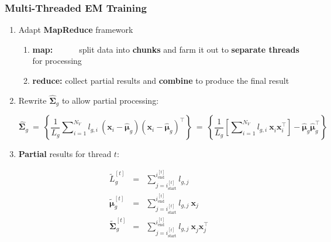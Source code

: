 \documentclass[usenames,dvipsnames]{beamer}
\def\Vec#1{{\boldsymbol{#1}}}
\def\Mat#1{{\boldsymbol{#1}}}
\begin{document}
%
%
%

\begin{frame}
\frametitle{Multi-Threaded EM Training}

\vspace{-1ex}
\begin{enumerate}[{~~$\boldsymbol{\bullet}$}]

\item Adapt {\bf MapReduce} framework

\begin{enumerate}[{$\boldsymbol{\rightarrow}$}]
\renewcommand{\itemsep}{0.5ex}
\item {\bf map:~~~~~} split data into {\bf chunks} and farm it out to {\bf separate threads} for processing
\item {\bf reduce:} collect partial results and {\bf combine} to produce the final result
\end{enumerate}
\vspace{0.5ex}

\item
Rewrite $\widehat{\Mat{\Sigma}}_g$ to allow partial processing:
\begin{scriptsize}%
\begin{equation*}
\widehat{\Mat{\Sigma}}_g
~=~ \left\{ \frac{1}{L_g} \sum\nolimits_{i=1}^{N_V} l_{g,i} ~ (\Vec{x}_i - \widehat{\Vec{\mu}}_g)(\Vec{x}_i - \widehat{\Vec{\mu}}_g)^\top \right\}
~=~ \left\{ \frac{1}{L_g} \left[ \sum\nolimits_{i=1}^{N_V} l_{g,i} ~ \Vec{x}_i^{~} \Vec{x}_i^\top  \right] - \widehat{\Vec{\mu}}_g^{~} \widehat{\Vec{\mu}}_g^\top \right\}
\end{equation*}%
\end{scriptsize}
\vspace{-1ex}

\item {\bf Partial} results for thread $t$:
%
\vspace{-3.5ex}
\begin{scriptsize}%
\begin{eqnarray*}
  \widetilde{L}_g^{[t]}            & = & \sum\nolimits_{j = i^{[t]}_{\textrm{start}}}^{i^{[t]}_{\textrm{end}}} l_{g,j}                             \\
  \widetilde{\Vec{\mu}}_g^{[t]}    & = & \sum\nolimits_{j = i^{[t]}_{\textrm{start}}}^{i^{[t]}_{\textrm{end}}} l_{g,j} ~ \Vec{x}_j                 \\
  \widetilde{\Mat{\Sigma}}_g^{[t]} & = & \sum\nolimits_{j = i^{[t]}_{\textrm{start}}}^{i^{[t]}_{\textrm{end}}} l_{g,j} ~ \Vec{x}_j^{~} \Vec{x}_j^\top
\end{eqnarray*}%
\end{scriptsize}
\vspace{-2ex}


\end{enumerate}
\end{frame}
\end{document}

